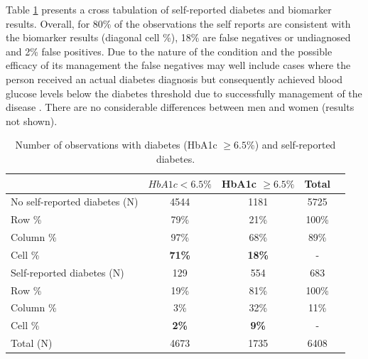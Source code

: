 \documentclass[12pt,english]{article}
\begin{document}
Table \ref{tab:Biomarker_observations} presents a cross tabulation of self-reported diabetes and biomarker results. Overall, for 80\% of the observations the self reports are consistent with the biomarker results (diagonal cell \%), 18\% are false negatives or undiagnosed and 2\% false positives. Due to the nature of the condition and the possible efficacy of its management the false negatives may well include cases where the person received an actual diabetes diagnosis but consequently achieved blood glucose levels below the diabetes threshold due to successfully management of the disease \parencite{Flores-Hernandez2015}.  There are no considerable differences between men and women (results not shown). 


\begin{table}[ht]
\caption{\label{tab:Biomarker_observations}Number of observations with diabetes (HbA1c $\geq 6.5\%$) and self-reported diabetes.}
\begin{center}
\begin{adjustbox}{max width=\linewidth}
\begin{threeparttable}
{
\def\sym#1{\ifmmode^{#1}\else\(^{#1}\)\fi}
\begin{tabular}{lcccc}
\toprule
            &\multicolumn{1}{c}{$HbA1c < 6.5\%$}&\multicolumn{1}{c}{HbA1c $\geq 6.5\%$}&\multicolumn{1}{c}{Total}\\
\midrule
No self-reported diabetes (N) & 4544 & 1181 & 5725 &  \\
\hspace*{10mm}Row  \% & 79\% & 21\% & 100\% &  \\
\hspace*{10mm}Column \% & 97\% & 68\% & 89\% &  \\
\hspace*{10mm}Cell \% & \textbf{71\%} & \textbf{18\%} & - & \\
Self-reported diabetes (N) & 129 & 554 & 683 &  \\
\hspace*{10mm}Row \%  & 19\% & 81\% & 100\% &  \\
\hspace*{10mm}Column \% & 3\% & 32\% & 11\% &  \\
\hspace*{10mm}Cell \% & \textbf{2\%} &\textbf{9\%} &- & \\
Total (N) & 4673 & 1735 & 6408 &  \\ 
\bottomrule
\end{tabular}
\begin{tablenotes}
\item
\end{tablenotes}
}
\end{threeparttable}
\end{adjustbox}
\end{center}
\end{table}
\end{document}
